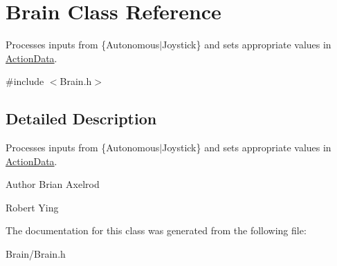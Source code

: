 \hypertarget{class_brain}{\section{\-Brain \-Class \-Reference}
\label{class_brain}
}


\-Processes inputs from \{\-Autonomous$|$\-Joystick\} and sets appropriate values in \hyperlink{class_action_data}{\-Action\-Data}.  




{\ttfamily \#include $<$\-Brain.\-h$>$}



\subsection{\-Detailed \-Description}
\-Processes inputs from \{\-Autonomous$|$\-Joystick\} and sets appropriate values in \hyperlink{class_action_data}{\-Action\-Data}. 

\begin{DoxyAuthor}{\-Author}
\-Brian \-Axelrod 

\-Robert \-Ying 
\end{DoxyAuthor}


\-The documentation for this class was generated from the following file\-:\begin{DoxyCompactItemize}
\item 
\-Brain/\-Brain.\-h\end{DoxyCompactItemize}
